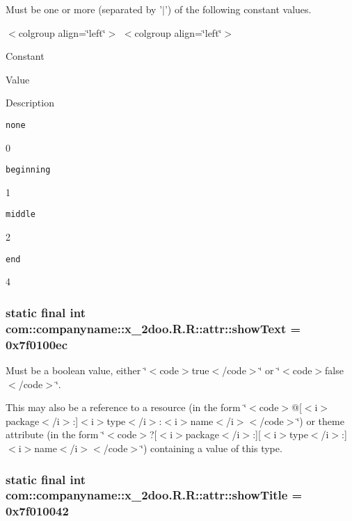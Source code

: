Must be one or more (separated by '$|$') of the following constant values. \begin{TabularC}{0}
\hline
\end{TabularC}
$<$colgroup align=\char`\"{}left\char`\"{}$>$ $<$colgroup align=\char`\"{}left\char`\"{}$>$ 

Constant

Value

Description 

{\tt none}

0

{\tt beginning}

1

{\tt middle}

2

{\tt end}

4\hypertarget{classcom_1_1companyname_1_1x__2doo_1_1_r_1_1attr_9517eb4c9166fcf0007455b880b36d52}{
\subsubsection[{showText}]{\setlength{\rightskip}{0pt plus 5cm}static final int com::companyname::x\_\-2doo.R.R::attr::showText = 0x7f0100ec}}
\label{classcom_1_1companyname_1_1x__2doo_1_1_r_1_1attr_9517eb4c9166fcf0007455b880b36d52}


Must be a boolean value, either \char`\"{}$<$code$>$true$<$/code$>$\char`\"{} or \char`\"{}$<$code$>$false$<$/code$>$\char`\"{}. 

This may also be a reference to a resource (in the form \char`\"{}$<$code$>$@\mbox{[}$<$i$>$package$<$/i$>$:\mbox{]}$<$i$>$type$<$/i$>$:$<$i$>$name$<$/i$>$$<$/code$>$\char`\"{}) or theme attribute (in the form \char`\"{}$<$code$>$?\mbox{[}$<$i$>$package$<$/i$>$:\mbox{]}\mbox{[}$<$i$>$type$<$/i$>$:\mbox{]}$<$i$>$name$<$/i$>$$<$/code$>$\char`\"{}) containing a value of this type. \hypertarget{classcom_1_1companyname_1_1x__2doo_1_1_r_1_1attr_7ae7cd69155b1a6e4c15c710e5357461}{
\subsubsection[{showTitle}]{\setlength{\rightskip}{0pt plus 5cm}static final int com::companyname::x\_\-2doo.R.R::attr::showTitle = 0x7f010042}}
\label{classcom_1_1companyname_1_1x__2doo_1_1_r_1_1attr_7ae7cd69155b1a6e4c15c710e5357461}


